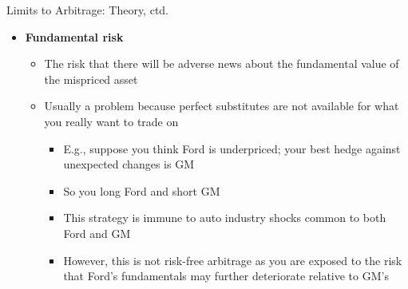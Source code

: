\documentclass[aspectratio=169, 11pt]{beamer}
\begin{document}
\begin{frame}[shrink=5]{Limits to Arbitrage: Theory, ctd.}
\begin{itemize}
\item \textbf{Fundamental risk}
  \begin{itemize}
  \item The risk that there will be adverse news about the fundamental value of the mispriced asset
  \item Usually a problem because perfect substitutes are not available for what you really want to trade on
    \begin{itemize}
    \item E.g., suppose you think Ford is underpriced; your best hedge against unexpected changes is GM
    \item So you long Ford and short GM
    \item This strategy is immune to auto industry shocks common to both Ford and GM
    \item However, this is not risk-free arbitrage as you are exposed to the risk that Ford's fundamentals may further deteriorate relative to GM's
    \end{itemize}
  \end{itemize}
\end{itemize}
\end{frame}
\end{document}
